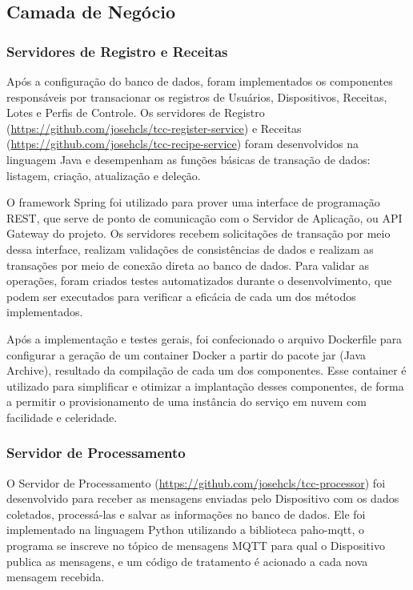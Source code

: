 \subsection{Camada de Negócio}


\subsubsection{Servidores de Registro e Receitas}


Após a configuração do banco de dados, foram implementados os componentes responsáveis por transacionar os registros de Usuários, Dispositivos, Receitas, Lotes e Perfis de Controle. 
Os servidores de Registro (\url{https://github.com/josehcls/tcc-register-service}) e Receitas (\url{https://github.com/josehcls/tcc-recipe-service}) foram desenvolvidos na linguagem Java e desempenham as funções básicas de transação de dados: listagem, criação, atualização e deleção. 


O framework Spring foi utilizado para prover uma interface de programação REST, que serve de ponto de comunicação com o Servidor de Aplicação, ou API Gateway do projeto. Os servidores recebem solicitações de transação por meio dessa interface, realizam validações de consistências de dados e realizam as transações por meio de conexão direta ao banco de dados. Para validar as operações, foram criados testes automatizados durante o desenvolvimento, que podem ser executados para verificar a eficácia de cada um dos métodos implementados.


Após a implementação e testes gerais, foi confecionado o arquivo Dockerfile para configurar a geração de um container Docker a partir do pacote jar (Java Archive), resultado da compilação de cada um dos componentes.
Esse container é utilizado para simplificar e otimizar a implantação desses componentes, de forma a permitir o provisionamento de uma instância do serviço em nuvem com facilidade e celeridade.


\subsubsection{Servidor de Processamento}


O Servidor de Processamento (\url{https://github.com/josehcls/tcc-processor}) foi desenvolvido para receber as mensagens enviadas pelo Dispositivo com os dados coletados, processá-las e salvar as informações no banco de dados. Ele foi implementado na linguagem Python utilizando a biblioteca paho-mqtt, o programa se inscreve no tópico de mensagens MQTT para qual o Dispositivo publica as mensagens, e um código de tratamento é acionado a cada nova mensagem recebida. 


